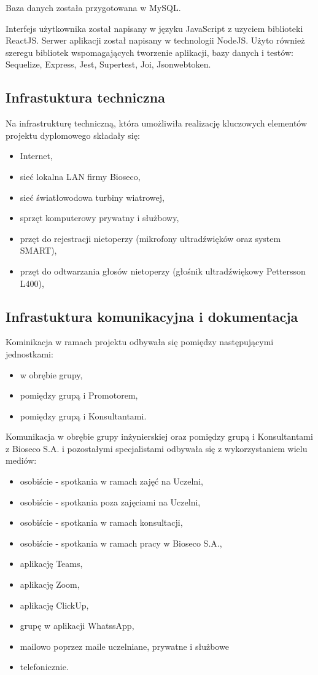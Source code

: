 \documentclass{sprz}
\begin{document}
Baza danych została przygotowana w MySQL.

Interfejs użytkownika został napisany w języku JavaScript z uzyciem biblioteki ReactJS. Serwer aplikacji został napisany w technologii NodeJS. Użyto również szeregu bibliotek wspomagających tworzenie aplikacji, bazy danych i testów: Sequelize, Express, Jest, Supertest, Joi, Jsonwebtoken. 

\subsection{Infrastuktura techniczna}
Na infrastrukturę techniczną, która umożliwiła realizację kluczowych elementów projektu dyplomowego składały się:
\begin{itemize}
  \item{Internet,}
  \item{sieć lokalna LAN firmy Bioseco,}
  \item{sieć światłowodowa turbiny wiatrowej,}
  \item{sprzęt komputerowy prywatny i służbowy,}
  \item{przęt do rejestracji nietoperzy (mikrofony ultradźwięków oraz system SMART),}
  \item{przęt do odtwarzania głosów nietoperzy (głośnik ultradźwiękowy Pettersson L400),}
  \end{itemize}

\subsection{Infrastuktura komunikacyjna i dokumentacja}
Kominikacja w ramach projektu odbywała się pomiędzy następującymi jednostkami:
\begin{itemize}
  \item{w obrębie grupy,}
  \item{pomiędzy grupą i Promotorem,}
  \item{pomiędzy grupą i Konsultantami.}
  \end{itemize}

Komunikacja w obrębie grupy inżynierskiej oraz pomiędzy grupą i Konsultantami z Bioseco S.A. i pozostałymi specjalistami odbywała się z wykorzystaniem wielu mediów:
\begin{itemize}
  \item{osobiście - spotkania w ramach zajęć na Uczelni,}
  \item{osobiście - spotkania poza zajęciami na Uczelni,}
  \item{osobiście - spotkania w ramach konsultacji,}
  \item{osobiście - spotkania w ramach pracy w Bioseco S.A.,}
  \item{aplikację Teams,}
  \item{aplikację Zoom,}
  \item{aplikację ClickUp,}
  \item{grupę w aplikacji WhatssApp,}
  \item{mailowo poprzez maile uczelniane, prywatne i służbowe}
  \item{telefonicznie.}
  \end{itemize}
\end{document}
